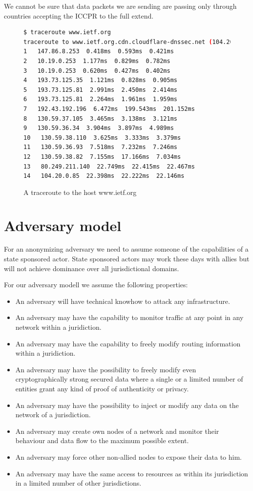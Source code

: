 We cannot be sure that data packets we are sending are passing only through countries accepting the ICCPR to the full extend.

\begin{figure}[H]
	\begin{lstlisting}[language=bash,breaklines=true,basicstyle=\tiny]
$ traceroute www.ietf.org
traceroute to www.ietf.org.cdn.cloudflare-dnssec.net (104.20.0.85), 64 hops max
1   147.86.8.253  0.418ms  0.593ms  0.421ms
2   10.19.0.253  1.177ms  0.829ms  0.782ms
3   10.19.0.253  0.620ms  0.427ms  0.402ms
4   193.73.125.35  1.121ms  0.828ms  0.905ms
5   193.73.125.81  2.991ms  2.450ms  2.414ms
6   193.73.125.81  2.264ms  1.961ms  1.959ms
7   192.43.192.196  6.472ms  199.543ms  201.152ms
8   130.59.37.105  3.465ms  3.138ms  3.121ms
9   130.59.36.34  3.904ms  3.897ms  4.989ms
10   130.59.38.110  3.625ms  3.333ms  3.379ms
11   130.59.36.93  7.518ms  7.232ms  7.246ms
12   130.59.38.82  7.155ms  17.166ms  7.034ms
13   80.249.211.140  22.749ms  22.415ms  22.467ms
14   104.20.0.85  22.398ms  22.222ms  22.146ms
	\end{lstlisting}
	\caption{A traceroute to the host www.ietf.org}
\end{figure}

\section{Adversary model\label{sec:adversary}}
For an anonymizing adversary we need to assume someone of the capabilities of a state sponsored actor. State sponsored actors may work these days with allies but will not achieve dominance over all jurisdictional domains.

For our adversary modell we assume the following properties:
\begin{itemize}
	\item An adversary will have technical knowhow to attack any infrastructure.
	\item An adversary may have the capability to monitor traffic at any point in any network within a juridiction.
	\item An adversary may have the capability to freely modify routing information within a juridiction.
	\item An adversary may have the possibility to freely modify even cryptographically strong secured data where a single or a limited number of entities grant any kind of proof of authenticity or privacy.
	\item An adversary may have the possibility to inject or modify any data on the network of a jurisdiction.
	\item An adversary may create own nodes of a network and monitor their behaviour and data flow to the maximum possible extent.
	\item An adversary may force other non-allied nodes to expose their data to him.
	\item An adversary may have the same access to resources as within its jurisdiction in a limited number of other jurisdictions.
\end{itemize}

